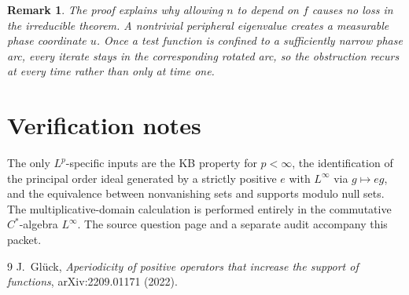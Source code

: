 \documentclass[11pt]{article}
\newtheorem{remark}[theorem]{Remark}
\begin{document}
\begin{remark}
The proof explains why allowing $n$ to depend on $f$ causes no loss in the
irreducible theorem.  A nontrivial peripheral eigenvalue creates a measurable
phase coordinate $u$.  Once a test function is confined to a sufficiently
narrow phase arc, every iterate stays in the corresponding rotated arc, so
the obstruction recurs at every time rather than only at time one.
\end{remark}

\section*{Verification notes}

The only $L^p$-specific inputs are the KB property for $p<\infty$, the
identification of the principal order ideal generated by a strictly positive
$e$ with $L^\infty$ via $g\mapsto eg$, and the equivalence between
nonvanishing sets and supports modulo null sets.  The multiplicative-domain
calculation is performed entirely in the commutative $C^*$-algebra
$L^\infty$.  The source question page and a separate audit accompany this
packet.

\begin{thebibliography}{9}
J.~Gl\"uck,
\emph{Aperiodicity of positive operators that increase the support of
functions}, arXiv:2209.01171 (2022).
\end{thebibliography}
\end{document}
